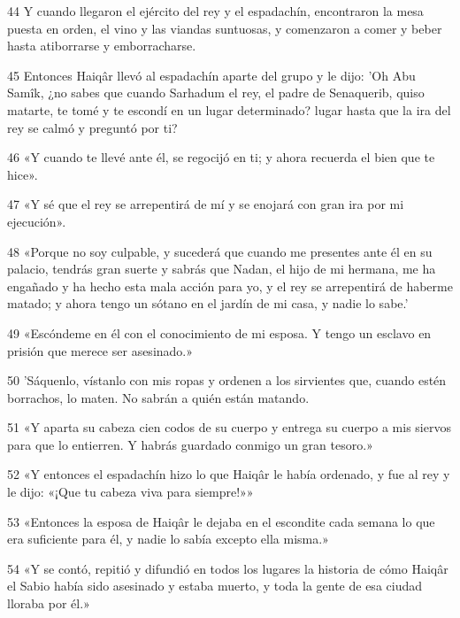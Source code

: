 \par 44 Y cuando llegaron el ejército del rey y el espadachín, encontraron la mesa puesta en orden, el vino y las viandas suntuosas, y comenzaron a comer y beber hasta atiborrarse y emborracharse.

\par 45 Entonces Haiqâr llevó al espadachín aparte del grupo y le dijo: 'Oh Abu Samîk, ¿no sabes que cuando Sarhadum el rey, el padre de Senaquerib, quiso matarte, te tomé y te escondí en un lugar determinado? lugar hasta que la ira del rey se calmó y preguntó por ti?

\par 46 «Y cuando te llevé ante él, se regocijó en ti; y ahora recuerda el bien que te hice».

\par 47 «Y sé que el rey se arrepentirá de mí y se enojará con gran ira por mi ejecución».

\par 48 «Porque no soy culpable, y sucederá que cuando me presentes ante él en su palacio, tendrás gran suerte y sabrás que Nadan, el hijo de mi hermana, me ha engañado y ha hecho esta mala acción para yo, y el rey se arrepentirá de haberme matado; y ahora tengo un sótano en el jardín de mi casa, y nadie lo sabe.'

\par 49 «Escóndeme en él con el conocimiento de mi esposa. Y tengo un esclavo en prisión que merece ser asesinado.»

\par 50 'Sáquenlo, vístanlo con mis ropas y ordenen a los sirvientes que, cuando estén borrachos, lo maten. No sabrán a quién están matando.

\par 51 «Y aparta su cabeza cien codos de su cuerpo y entrega su cuerpo a mis siervos para que lo entierren. Y habrás guardado conmigo un gran tesoro.»

\par 52 «Y entonces el espadachín hizo lo que Haiqâr le había ordenado, y fue al rey y le dijo: «¡Que tu cabeza viva para siempre!»»

\par 53 «Entonces la esposa de Haiqâr le dejaba en el escondite cada semana lo que era suficiente para él, y nadie lo sabía excepto ella misma.»

\par 54 «Y se contó, repitió y difundió en todos los lugares la historia de cómo Haiqâr el Sabio había sido asesinado y estaba muerto, y toda la gente de esa ciudad lloraba por él.»


